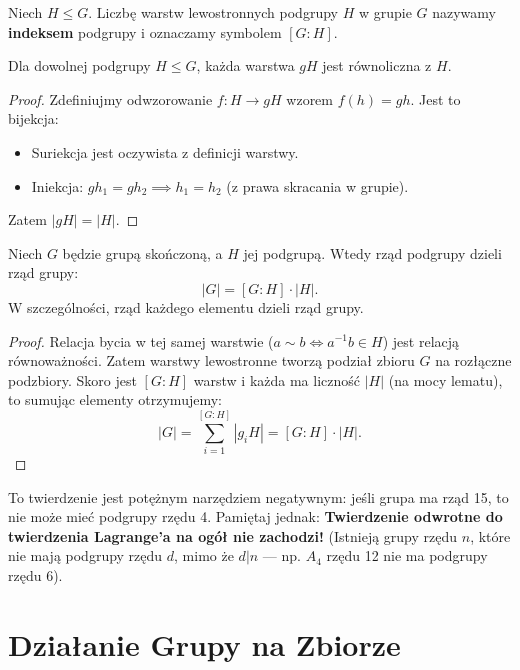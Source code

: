 \begin{definition}
Niech $H \le G$. Liczbę warstw lewostronnych podgrupy $H$ w grupie $G$ nazywamy \textbf{indeksem} podgrupy i oznaczamy symbolem $[G:H]$.
\end{definition}

\begin{lemma}
Dla dowolnej podgrupy $H \le G$, każda warstwa $gH$ jest równoliczna z $H$.
\end{lemma}

\begin{proof}
Zdefiniujmy odwzorowanie $f: H \to gH$ wzorem $f(h) = gh$.
Jest to bijekcja:
\begin{itemize}
    \item Suriekcja jest oczywista z definicji warstwy.
    \item Iniekcja: $gh_1 = gh_2 \implies h_1 = h_2$ (z prawa skracania w grupie).
\end{itemize}
Zatem $|gH| = |H|$.
\end{proof}

\begin{theorem}
Niech $G$ będzie grupą skończoną, a $H$ jej podgrupą. Wtedy rząd podgrupy dzieli rząd grupy:
\[ |G| = [G:H] \cdot |H|. \]
W szczególności, rząd każdego elementu dzieli rząd grupy.
\end{theorem}

\begin{proof}
Relacja bycia w tej samej warstwie ($a \sim b \iff a^{-1}b \in H$) jest relacją równoważności. Zatem warstwy lewostronne tworzą podział zbioru $G$ na rozłączne podzbiory.
Skoro jest $[G:H]$ warstw i każda ma liczność $|H|$ (na mocy lematu), to sumując elementy otrzymujemy:
\[ |G| = \sum_{i=1}^{[G:H]} |g_i H| = [G:H] \cdot |H|. \]
\end{proof}

\begin{remark}
To twierdzenie jest potężnym narzędziem negatywnym: jeśli grupa ma rząd 15, to nie może mieć podgrupy rzędu 4. Pamiętaj jednak: \textbf{Twierdzenie odwrotne do twierdzenia Lagrange'a na ogół nie zachodzi!} (Istnieją grupy rzędu $n$, które nie mają podgrupy rzędu $d$, mimo że $d|n$ — np. $A_4$ rzędu 12 nie ma podgrupy rzędu 6).
\end{remark}

\section{Działanie Grupy na Zbiorze}

